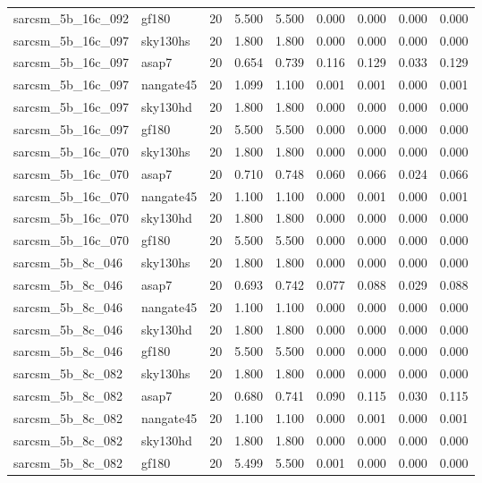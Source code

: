 \begin{tabular}{llrrrrrrr}
sarcsm\_5b\_16c\_092 & gf180 & 20 & 5.500 & 5.500 & 0.000 & 0.000 & 0.000 & 0.000 \\
sarcsm\_5b\_16c\_097 & sky130hs & 20 & 1.800 & 1.800 & 0.000 & 0.000 & 0.000 & 0.000 \\
sarcsm\_5b\_16c\_097 & asap7 & 20 & 0.654 & 0.739 & 0.116 & 0.129 & 0.033 & 0.129 \\
sarcsm\_5b\_16c\_097 & nangate45 & 20 & 1.099 & 1.100 & 0.001 & 0.001 & 0.000 & 0.001 \\
sarcsm\_5b\_16c\_097 & sky130hd & 20 & 1.800 & 1.800 & 0.000 & 0.000 & 0.000 & 0.000 \\
sarcsm\_5b\_16c\_097 & gf180 & 20 & 5.500 & 5.500 & 0.000 & 0.000 & 0.000 & 0.000 \\
sarcsm\_5b\_16c\_070 & sky130hs & 20 & 1.800 & 1.800 & 0.000 & 0.000 & 0.000 & 0.000 \\
sarcsm\_5b\_16c\_070 & asap7 & 20 & 0.710 & 0.748 & 0.060 & 0.066 & 0.024 & 0.066 \\
sarcsm\_5b\_16c\_070 & nangate45 & 20 & 1.100 & 1.100 & 0.000 & 0.001 & 0.000 & 0.001 \\
sarcsm\_5b\_16c\_070 & sky130hd & 20 & 1.800 & 1.800 & 0.000 & 0.000 & 0.000 & 0.000 \\
sarcsm\_5b\_16c\_070 & gf180 & 20 & 5.500 & 5.500 & 0.000 & 0.000 & 0.000 & 0.000 \\
sarcsm\_5b\_8c\_046 & sky130hs & 20 & 1.800 & 1.800 & 0.000 & 0.000 & 0.000 & 0.000 \\
sarcsm\_5b\_8c\_046 & asap7 & 20 & 0.693 & 0.742 & 0.077 & 0.088 & 0.029 & 0.088 \\
sarcsm\_5b\_8c\_046 & nangate45 & 20 & 1.100 & 1.100 & 0.000 & 0.000 & 0.000 & 0.000 \\
sarcsm\_5b\_8c\_046 & sky130hd & 20 & 1.800 & 1.800 & 0.000 & 0.000 & 0.000 & 0.000 \\
sarcsm\_5b\_8c\_046 & gf180 & 20 & 5.500 & 5.500 & 0.000 & 0.000 & 0.000 & 0.000 \\
sarcsm\_5b\_8c\_082 & sky130hs & 20 & 1.800 & 1.800 & 0.000 & 0.000 & 0.000 & 0.000 \\
sarcsm\_5b\_8c\_082 & asap7 & 20 & 0.680 & 0.741 & 0.090 & 0.115 & 0.030 & 0.115 \\
sarcsm\_5b\_8c\_082 & nangate45 & 20 & 1.100 & 1.100 & 0.000 & 0.001 & 0.000 & 0.001 \\
sarcsm\_5b\_8c\_082 & sky130hd & 20 & 1.800 & 1.800 & 0.000 & 0.000 & 0.000 & 0.000 \\
sarcsm\_5b\_8c\_082 & gf180 & 20 & 5.499 & 5.500 & 0.001 & 0.000 & 0.000 & 0.000 \\

\end{tabular}
